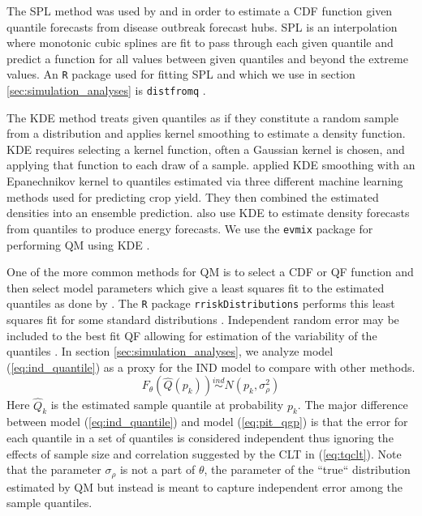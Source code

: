 \documentclass[preprint,12pt,authoryear]{elsarticle}
\newcommand{\1}[1]{\mathds{1}\left[#1\right]}
\begin{document}
The SPL method was used by \cite{gerding2023evaluating} and 
\cite{shandross2024hubensembles} in order to estimate a CDF function given 
quantile forecasts from disease outbreak forecast hubs. SPL is an interpolation 
where monotonic cubic splines are fit to pass through each given quantile and 
predict a function for all values between given quantiles and beyond the 
extreme values. An \texttt{R} package used for fitting SPL and which we use in 
section \ref{sec:simulation_analyses} is \texttt{distfromq} 
\cite[]{ray2024quantmatch}.

The KDE method treats given quantiles as if they constitute a random sample 
from a distribution and applies kernel smoothing to estimate a density 
function. KDE requires selecting a kernel function, often a Gaussian kernel is 
chosen, and applying that function to each draw of a sample. 
\cite{gyamerah2020probabilistic} applied KDE smoothing with an Epanechnikov 
kernel to quantiles estimated via three different machine learning methods 
used for predicting crop yield. They then combined the estimated densities 
into an ensemble prediction. \cite{he2016short} also use KDE to estimate 
density forecasts from quantiles to produce energy forecasts. We use the 
\texttt{evmix} package for performing QM using KDE \cite[]{yang2018kde}.

One of the more common methods for QM is to select a CDF or QF function and 
then select model parameters which give a least squares fit to the estimated 
quantiles as done by \cite{li2019combining}. 
The \texttt{R} package \texttt{rriskDistributions} performs this least squares 
fit for some standard distributions \cite[]{belgorodski2017quantilemse}. 
Independent random error may be included to the best fit QF allowing for 
estimation of the variability of the quantiles \cite[]{nirwan2020bayesian}. 
In section \ref{sec:simulation_analyses}, we analyze model 
(\ref{eq:ind_quantile}) as a proxy for the IND model to compare with 
other methods. 
\begin{equation}
    \label{eq:ind_quantile}
    F_{\theta}(\hat{Q}(p_k)) \overset{ind}{\sim} N(p_k, \sigma_{\rho}^2)
\end{equation}
Here $\hat{Q}_k$ is the estimated sample quantile at probability $p_k$. 
The major difference between model (\ref{eq:ind_quantile}) and model 
(\ref{eq:pit_qgp}) is that the error for each quantile in a set of quantiles is 
considered independent thus ignoring the effects of sample size and correlation 
suggested by the CLT in (\ref{eq:tqclt}). Note that the parameter 
$\sigma_{\rho}$ is not a part of $\theta$, the parameter of the ``true`` 
distribution estimated by QM but instead is meant to capture independent 
error among the sample quantiles.
\end{document}
